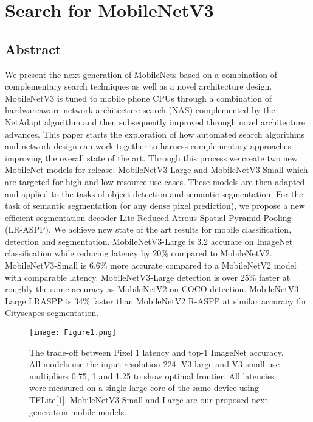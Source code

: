 \section{Search for MobileNetV3}

\subsection*{Abstract}

We present the next generation of MobileNets based on a combination of complementary search techniques as well
as a novel architecture design. MobileNetV3 is tuned to mobile phone CPUs through a combination of hardwareaware
network architecture search (NAS) complemented by the NetAdapt algorithm and then subsequently improved
through novel architecture advances. This paper starts the exploration of how automated search algorithms and network
design can work together to harness complementary approaches improving the overall state of the art. Through
this process we create two new MobileNet models for release: MobileNetV3-Large and MobileNetV3-Small which
are targeted for high and low resource use cases. These models are then adapted and applied to the tasks of object
detection and semantic segmentation. For the task of semantic segmentation (or any dense pixel prediction), we
propose a new efficient segmentation decoder Lite Reduced Atrous Spatial Pyramid Pooling (LR-ASPP). We achieve
new state of the art results for mobile classification, detection and segmentation. MobileNetV3-Large is 3.2%
accurate on ImageNet classification while reducing latency by 20\% compared to MobileNetV2. MobileNetV3-Small is
6.6\% more accurate compared to a MobileNetV2 model with comparable latency. MobileNetV3-Large detection
is over 25\% faster at roughly the same accuracy as MobileNetV2 on COCO detection. MobileNetV3-Large LRASPP
is 34\% faster than MobileNetV2 R-ASPP at similar accuracy for Cityscapes segmentation.

\begin{figure}[!htbp]
    \centering
    \texttt{[image: Figure1.png]}
    \caption{The trade-off between Pixel 1 latency and top-1 ImageNet accuracy. All models use the input resolution 224. V3 large
    and V3 small use multipliers 0.75, 1 and 1.25 to show optimal frontier. All latencies were measured on a single large core of the
    same device using TFLite[1]. MobileNetV3-Small and Large are our proposed next-generation mobile models.}
\end{figure}

